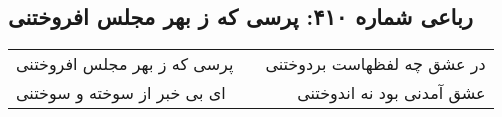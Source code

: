\begin{center}
\section*{رباعی شماره ۴۱۰: پرسی که ز بهر مجلس افروختنی}
\label{sec:sh410}
\begin{longtable}{l p{0.5cm} r}
پرسی که ز بهر مجلس افروختنی
&&
در عشق چه لفظهاست بردوختنی
\\
ای بی خبر از سوخته و سوختنی
&&
عشق آمدنی بود نه اندوختنی
\\
\end{longtable}
\end{center}
